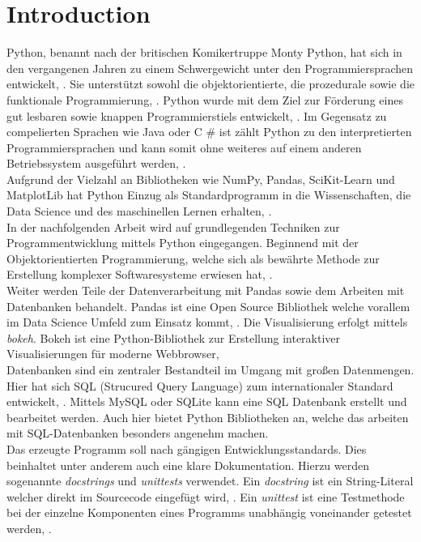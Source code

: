 \chapter{Introduction}

Python, benannt nach der britischen Komikertruppe Monty Python, hat sich in den vergangenen Jahren zu einem Schwergewicht unter den Programmiersprachen entwickelt, \cite{Steyer:2018}.
Sie unterstützt sowohl die objektorientierte, die prozedurale sowie die funktionale Programmierung, \cite{Häberlein:2024}. Python wurde mit dem Ziel zur Förderung eines gut lesbaren sowie knappen Programmierstiels entwickelt, \cite{Steyer:2018}. 
Im Gegensatz zu compelierten Sprachen wie Java oder C \# ist zählt Python zu den interpretierten Programmiersprachen und kann somit ohne weiteres auf einem anderen Betriebssystem ausgeführt werden, \cite{Häberlein:2024}. \\
Aufgrund der Vielzahl an Bibliotheken wie NumPy, Pandas, SciKit-Learn und MatplotLib hat Python Einzug als Standardprogramm in die Wissenschaften, die Data Science und des maschinellen Lernen erhalten, \cite{VanderPlas:2023}. \\
In der nachfolgenden Arbeit wird auf grundlegenden Techniken zur Programmentwicklung mittels Python eingegangen. Beginnend mit der Objektorientierten Programmierung, welche sich als bewährte Methode zur Erstellung komplexer Softwaresysteme erwiesen hat, \cite{Lahres:2021}.\\
Weiter werden Teile der Datenverarbeitung mit Pandas sowie dem Arbeiten mit Datenbanken behandelt. Pandas ist eine Open Source Bibliothek welche vorallem im Data Science Umfeld zum Einsatz kommt, \cite{Nelli:2023}. 
Die Visualisierung erfolgt mittels \textit{bokeh}. Bokeh ist eine Python-Bibliothek zur Erstellung interaktiver Visualisierungen für moderne Webbrowser, \cite{Boekeh}\\ 
Datenbanken sind ein zentraler Bestandteil im Umgang mit großen Datenmengen. Hier hat sich SQL (Strucured Query Language) zum internationaler Standard entwickelt, \cite{Taylor:2023}. Mittels MySQL oder SQLite kann eine SQL Datenbank erstellt und bearbeitet werden. Auch hier bietet Python Bibliotheken an, welche das arbeiten mit SQL-Datenbanken besonders angenehm machen.\\ 
Das erzeugte Programm soll nach gängigen Entwicklungsstandards. Dies beinhaltet unter anderem auch eine klare Dokumentation. Hierzu werden sogenannte \textit{docstrings} und \textit{unittests} verwendet. Ein \textit{docstring} ist ein String-Literal welcher direkt im Sourcecode eingefügt wird, \cite{Pajankar:2022}. Ein \textit{unittest} ist eine Testmethode bei der einzelne Komponenten eines Programms unabhängig voneinander getestet werden, \cite{Pajankar:2022}. \\
